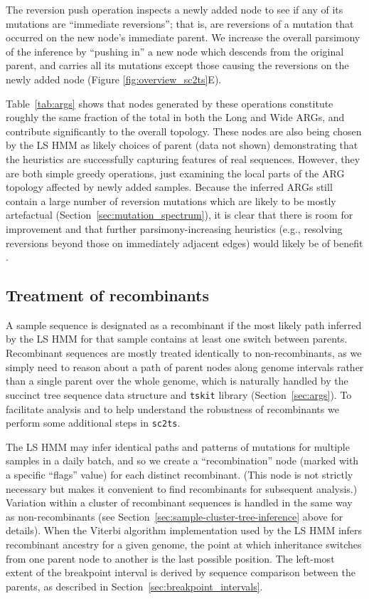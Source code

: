 \documentclass{article}
\begin{document}
The reversion push operation inspects a newly added node to see
if any of its mutations are ``immediate reversions''; that is,
are reversions of a mutation that occurred on the new node's
immediate parent. We increase the overall parsimony of the
inference by ``pushing in'' a new node which descends from the
original parent, and carries all its mutations except those
causing the reversions on the newly added node (Figure \ref{fig:overview_sc2ts}E).

Table~\ref{tab:args} shows that nodes generated by
these operations constitute
roughly the same fraction of the total in both the Long and Wide ARGs,
and contribute significantly to the overall topology.
These nodes are also being chosen by the
LS HMM as likely choices of parent (data not shown)
demonstrating that the heuristics are successfully
capturing features of real sequences.
However, they are both simple
greedy operations, just examining the local parts of the
ARG topology affected by newly added samples. Because the inferred
ARGs still contain a large number of reversion mutations which
are likely to be mostly artefactual (Section~\ref{sec:mutation_spectrum}),
it is clear that there
is room for improvement and that further parsimony-increasing
heuristics
(e.g., resolving reversions beyond those on immediately adjacent edges)
would likely be of benefit .

\subsection{Treatment of recombinants}
\label{sec:treatment_recombinants}
A sample sequence is designated as a recombinant if the most likely
path inferred by the LS HMM for that sample contains at least
one switch between parents. Recombinant sequences are mostly treated
identically to non-recombinants, as we simply need to reason about
a path of parent nodes along genome intervals rather than a
single parent over the whole genome, which is naturally handled by
the succinct tree sequence data structure and \texttt{tskit} library
(Section~\ref{sec:args}). To facilitate
analysis and to help understand the robustness of recombinants
we perform some additional steps in \texttt{sc2ts}.

The LS HMM may infer identical paths and patterns of mutations
for multiple samples in a daily batch, and so we
create a ``recombination'' node (marked with a specific ``flags'' value)
for each distinct recombinant. (This node is not strictly necessary
but makes it convenient to find recombinants for subsequent analysis.)
Variation within a cluster
of recombinant sequences is handled in the same way as non-recombinants
(see Section~\ref{sec:sample-cluster-tree-inference} above for details).
When the Viterbi algorithm implementation used by the LS HMM infers
recombinant ancestry for a given genome, the point at which inheritance
switches from one parent node to another is the last possible
position. The left-most extent of the breakpoint interval is derived
by sequence comparison between the parents, as described in
Section~\ref{sec:breakpoint_intervals}.
\end{document}
